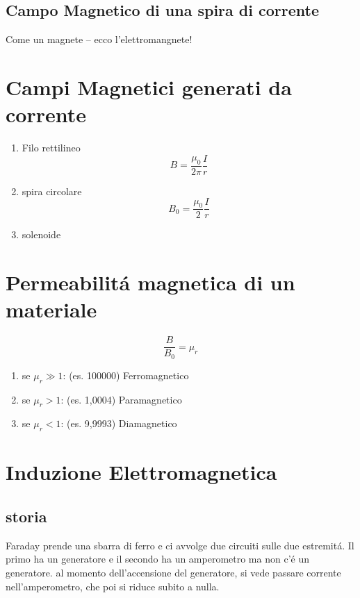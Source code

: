 \documentclass{article}
\begin{document}
\subsection*{Campo Magnetico di una spira di corrente}
Come un magnete -- ecco l'elettromangnete!
\section{Campi Magnetici generati da corrente}
\begin{enumerate}
    \item Filo rettilineo
    \[ B= \frac{\mu_0}{2\pi}\frac{I}{r}\]
    \item spira circolare
    \[ B_0= \frac{\mu_0}{2}\frac{I}{r}\]
    \item solenoide
    
\end{enumerate}
\section{Permeabilitá magnetica di un materiale}
\[\frac{B}{B_0}=\mu_r\]
\begin{enumerate}
    \item se $\mu_r \gg 1$: (es. 100000) Ferromagnetico
    \item se $\mu_r > 1$: (es. 1,0004) Paramagnetico
    \item se $\mu_r < 1$: (es. 9,9993) Diamagnetico
\end{enumerate}
\section{Induzione Elettromagnetica}
\subsection{storia}
Faraday prende una sbarra di ferro e ci avvolge due circuiti sulle due estremitá. Il primo ha un generatore e il secondo ha un amperometro ma non c'é un generatore. al momento dell'accensione del generatore, si vede passare corrente nell'amperometro, che poi si riduce subito a nulla.
\end{document}
